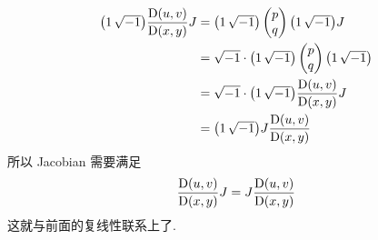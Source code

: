             \begin{align*}
                {\setlength{\arraycolsep}{0.8pt}\begin{pmatrix} 1 & \mi \end{pmatrix}}\pD{u,v}{x,y}J 
                &= {\setlength{\arraycolsep}{0.8pt}\begin{pmatrix} 1 & \mi \end{pmatrix}}
                \begin{pmatrix} p \\ q \end{pmatrix}
                {\setlength{\arraycolsep}{0.8pt}\begin{pmatrix} 1 & \mi \end{pmatrix}}J \\
                &= \mi\cdot{\setlength{\arraycolsep}{0.8pt}\begin{pmatrix} 1 & \mi \end{pmatrix}}
                \begin{pmatrix} p \\ q \end{pmatrix}
                {\setlength{\arraycolsep}{0.8pt}\begin{pmatrix} 1 & \mi \end{pmatrix}} \\
                &= \mi\cdot{\setlength{\arraycolsep}{0.8pt}\begin{pmatrix} 1 & \mi \end{pmatrix}}\pD{u,v}{x,y}J \\
                &= {\setlength{\arraycolsep}{0.8pt}\begin{pmatrix} 1 & \mi \end{pmatrix}}J\pD{u,v}{x,y}
            \end{align*}
            所以 Jacobian 需要满足
            \begin{equation*}
                \frac{{\rm D}(u,v)}{{\rm D}(x,y)}J = J\frac{{\rm D}(u,v)}{{\rm D}(x,y)}
            \end{equation*}
            这就与前面的复线性联系上了.

